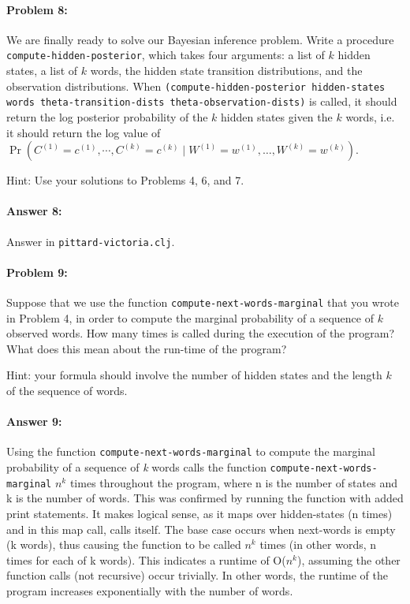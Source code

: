 \documentclass[10pt]{article}
\begin{document}
\hrulefill
\paragraph{Problem 8:}
We are finally ready to solve our Bayesian inference problem. Write a
procedure \texttt{compute-hidden-posterior}, which takes four
arguments: a list of $k$ hidden states, a list of $k$ words, the
hidden state transition distributions, and the observation
distributions. When \texttt{(compute-hidden-posterior hidden-states
  words theta-transition-dists theta-observation-dists)} is called, it
should return the log posterior probability of the $k$ hidden states
given the $k$ words, i.e. it should return the log value of
$\Pr(C^{(1)}=c^{(1)},\cdots,C^{(k)}=c^{(k)} \mid
W^{(1)}=w^{(1)},\dots,W^{(k)}=w^{(k)} )$.

\noindent Hint: Use your solutions to Problems 4, 6, and 7.


\paragraph{Answer 8:} Answer in
\texttt{pittard-victoria.clj}.

\hrulefill
\paragraph{Problem 9:}
Suppose that we use the function \texttt{compute-next-words-marginal}
that you wrote in Problem 4, in order to compute the marginal
probability of a sequence of $k$ observed words. How many times is
 called during the execution of the
program? What does this mean about the run-time of the program?

\noindent Hint: your formula should involve the number of hidden
states and the length $k$ of the sequence of words.

\paragraph{Answer 9:} Using the function \texttt{compute-next-words-marginal} to compute the marginal probability of a sequence of \textit{k} words calls the function \texttt{compute-next-words-marginal} $n^k$ times throughout the program, where n is the number of states and k is the number of words. This was confirmed by running the function with added print statements. It makes logical sense, as it maps over hidden-states (n times) and in this map call, calls itself. The base case occurs when next-words is empty (k words), thus causing the function to be called $n^k$ times (in other words, n times for each of k words). This indicates a runtime of O($n^k$), assuming the other function calls (not recursive) occur trivially. In other words, the runtime of the program increases exponentially with the number of words.
\end{document}
